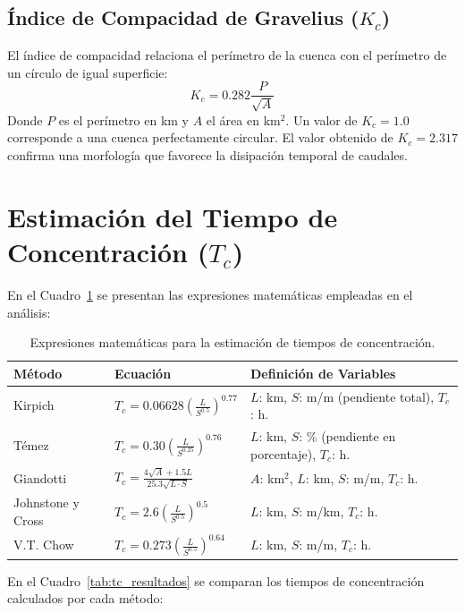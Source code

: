 \documentclass[11pt,a4paper]{article}
\begin{document}
\subsection*{Índice de Compacidad de Gravelius ($K_c$)}
El índice de compacidad relaciona el perímetro de la cuenca con el perímetro de un círculo de igual superficie:
\begin{equation}
K_c = 0.282 \frac{P}{\sqrt{A}}
\end{equation}
Donde $P$ es el perímetro en km y $A$ el área en km$^2$. Un valor de $K_c = 1.0$ corresponde a una cuenca perfectamente circular. El valor obtenido de $K_c = 2.317$ confirma una morfología que favorece la disipación temporal de caudales.

\section{Estimación del Tiempo de Concentración ($T_c$)}
En el Cuadro~\ref{tab:expresiones_tc} se presentan las expresiones matemáticas empleadas en el análisis:

\begin{table}[H]
\centering
\caption{Expresiones matemáticas para la estimación de tiempos de concentración.}
\label{tab:expresiones_tc}
\begin{tabular}{p{3.2cm}p{5.0cm}p{6.8cm}}\toprule
\textbf{Método} & \textbf{Ecuación} & \textbf{Definición de Variables} \\\midrule
Kirpich & $T_c = 0.06628 \left(\frac{L}{S^{0.5}}\right)^{0.77}$ & $L$: km, $S$: m/m (pendiente total), $T_c$: h. \\
Témez & $T_c = 0.30 \left(\frac{L}{S^{0.25}}\right)^{0.76}$ & $L$: km, $S$: \% (pendiente en porcentaje), $T_c$: h. \\
Giandotti & $T_c = \frac{4\sqrt{A} + 1.5 L}{25.3 \sqrt{L \cdot S}}$ & $A$: km$^2$, $L$: km, $S$: m/m, $T_c$: h. \\
Johnstone y Cross & $T_c = 2.6 \left(\frac{L}{S^{0.5}}\right)^{0.5}$ & $L$: km, $S$: m/km, $T_c$: h. \\
V.T. Chow & $T_c = 0.273 \left(\frac{L}{S^{0.5}}\right)^{0.64}$ & $L$: km, $S$: m/m, $T_c$: h. \\
\bottomrule
\end{tabular}
\end{table}

En el Cuadro~\ref{tab:tc_resultados} se comparan los tiempos de concentración calculados por cada método:
\end{document}
